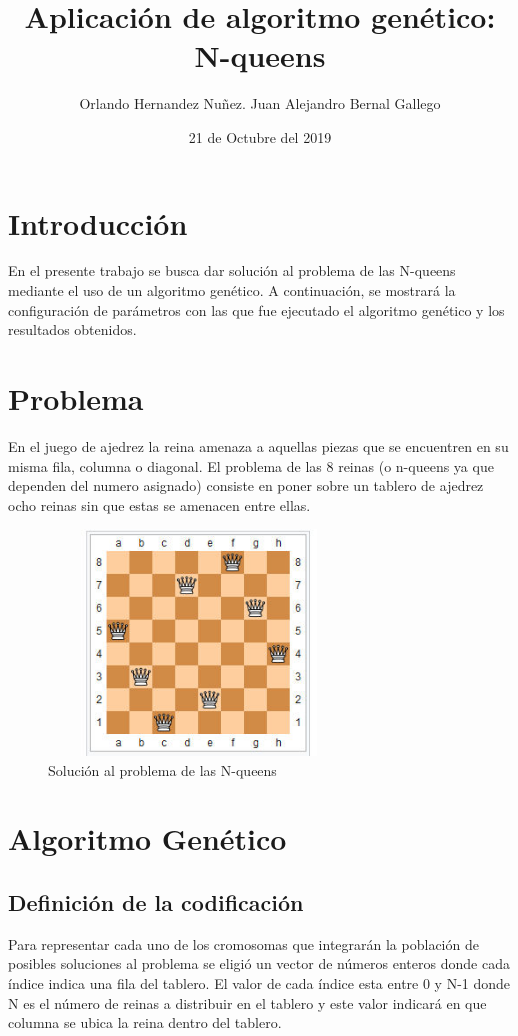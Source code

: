\documentclass[11pt]{article}
\begin{document}
\title{Aplicaci\'on de algoritmo gen\'etico: N-queens }
\author{Orlando Hernandez Nu\~nez. Juan Alejandro Bernal Gallego}
\date{21 de Octubre del 2019}
\maketitle

\section{Introducci\'on}
En el presente trabajo se busca dar soluci\'on al problema de las N-queens mediante el uso de un algoritmo gen\'etico. A continuaci\'on, se mostrar\'a la configuraci\'on de par\'ametros con las que fue ejecutado el algoritmo gen\'etico y los resultados obtenidos.

\section{Problema}
En el juego de ajedrez la reina amenaza a aquellas piezas que se encuentren en su misma fila, columna o diagonal. El problema de las 8 reinas (o n-queens ya que dependen del numero asignado) consiste en poner sobre un tablero de ajedrez ocho reinas sin que estas se amenacen entre ellas.
\begin{figure}[h]
\includegraphics[width=8cm, height=6cm]{nqueens}
\centering
\caption{Soluci\'on al problema de las N-queens}
\end{figure}
\section{Algoritmo Gen\'etico}
\subsection{Definici\'on de la codificaci\'on}
Para representar cada uno de los cromosomas que integrar\'an la poblaci\'on de posibles soluciones
al problema se eligi\'o un vector de n\'umeros enteros donde cada \'indice indica una fila del tablero.
El valor de cada \'indice esta entre 0 y N-1 donde N es el n\'umero de reinas a distribuir en el tablero
y este valor indicar\'a en que columna se ubica la reina dentro del tablero.
\end{document}
